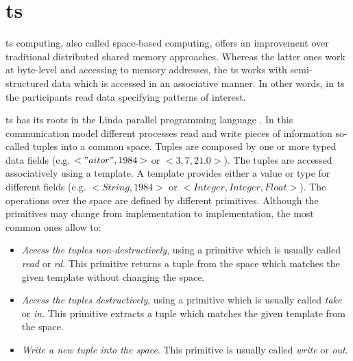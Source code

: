 \section{\acl{ts}}
\label{sec:tuplespaces_eoa}


\acf{ts} computing, also called space-based computing, offers an improvement over traditional distributed shared memory approaches.
Whereas the latter ones work at byte-level and accessing to memory addresses,
the \acl{ts} works with semi-structured data which is accessed in an associative manner.
In other words, in \ac{ts} the participants read data specifying patterns of interest.


\ac{ts} has its roots in the Linda parallel programming language \citep{gelernter_generative_1985}.
In this communication model different processes read and write pieces of information so-called tuples into a common space.
Tuples are composed by one or more typed data fields (e.g. $<"aitor",1984>$ or $<3,7,21.0>$).
The tuples are accessed associatively using a template.
A template provides either a value or type for different fields (e.g. $<String,1984>$ or $<Integer, Integer, Float>$).
The operations over the space are defined by different primitives.
Although the primitives may change from implementation to implementation, the most common ones allow to:

\begin{itemize}
  \item \emph{Access the tuples non-destructively}, using a primitive which is usually called \emph{read} or \emph{rd}.
	This primitive returns a tuple from the space which matches the given template without changing the space.
  \item \emph{Access the tuples destructively}, using a primitive which is usually called \emph{take} or \emph{in}.
	This primitive extracts a tuple which matches the given template from the space.
  \item \emph{Write a new tuple into the space}. This primitive is usually called \emph{write} or \emph{out}.
\end{itemize}